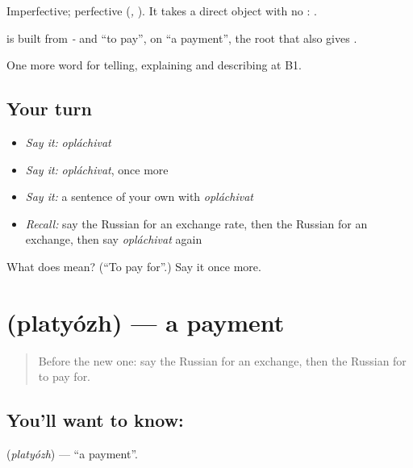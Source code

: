Imperfective; perfective \emph{} (\emph{, }). It takes a direct object with no \emph{}: \emph{ }.

\begin{cousinweb}
\textbf{} is built from \emph{-} and \emph{} \textquotedblleft{}to pay\textquotedblright{}, on \emph{} \textquotedblleft{}a payment\textquotedblright{}, the root that also gives \emph{}.
\end{cousinweb}

\begin{grammarlens}[title={What you've built}]
One more word for telling, explaining and describing at B1.
\end{grammarlens}

\subsection*{Your turn}
\begin{itemize}
\raggedright
  \item \emph{Say it:} \emph{opláchivat}
  \item \emph{Say it:} \emph{opláchivat}, once more
  \item \emph{Say it:} a sentence of your own with \emph{opláchivat}
  \item \emph{Recall:} say the Russian for an exchange rate, then the Russian for an exchange, then say \emph{opláchivat} again
\end{itemize}

\begin{tcolorbox}[breakable,colback=teal!4,colframe=teal!35!black,title={Before you move on}]
What does  mean? (\textquotedblleft{}To pay for\textquotedblright{}.) Say it once more.
\end{tcolorbox}
\section[\texorpdfstring{\ru{платёж} (platyózh)}{платёж (platyózh)}]{ (platyózh) — a payment}

\label{lesson:RU-C397-platyozh}



\begin{quote}
Before the new one: say the Russian for an exchange, then the Russian for to pay for.
\end{quote}

\subsection*{You'll want to know: }
\textbf{} (\emph{platyózh}) — \textquotedblleft{}a payment\textquotedblright{}.


